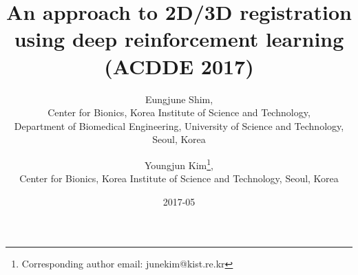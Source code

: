 \documentclass[10pt]{article}
\begin{document}
\title{An approach to 2D/3D registration using deep reinforcement learning \\(ACDDE 2017)}

\author{Eungjune Shim, \\
Center for Bionics, Korea Institute of Science and Technology, \\
Department of Biomedical Engineering, University of Science and Technology, Seoul, Korea
\and Youngjun Kim\thanks{Corresponding author email: junekim@kist.re.kr},
\\ Center for Bionics, Korea Institute of Science and Technology, Seoul, Korea}


%

\date{2017-05}
\maketitle
\end{document}
